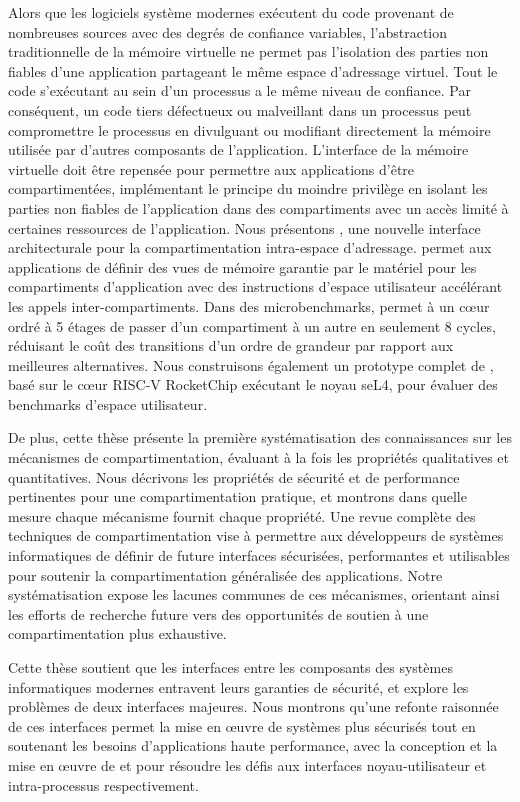 Alors que les logiciels système modernes exécutent du code provenant de nombreuses sources avec des degrés de confiance variables, l'abstraction traditionnelle de la mémoire virtuelle ne permet pas l'isolation des parties non fiables d'une application partageant le même espace d'adressage virtuel. 
Tout le code s'exécutant au sein d'un processus a le même niveau de confiance. 
Par conséquent, un code tiers défectueux ou malveillant dans un processus peut compromettre le processus en divulguant ou modifiant directement la mémoire utilisée par d'autres composants de l'application. 
L'interface de la mémoire virtuelle doit être repensée pour permettre aux applications d'être compartimentées, implémentant le principe du moindre privilège en isolant les parties non fiables de l'application dans des compartiments avec un accès limité à certaines ressources de l'application. 
Nous présentons \seccells, une nouvelle interface architecturale pour la compartimentation intra-espace d'adressage. \seccells permet aux applications de définir des vues de mémoire garantie par le matériel pour les compartiments d'application avec des instructions d'espace utilisateur accélérant les appels inter-compartiments. 
Dans des microbenchmarks, \seccells permet à un cœur ordré à 5 étages de passer d'un compartiment à un autre en seulement 8 cycles, réduisant le coût des transitions d'un ordre de grandeur par rapport aux meilleures alternatives. 
Nous construisons également un prototype complet de \seccells, basé sur le cœur RISC-V RocketChip exécutant le noyau seL4, pour évaluer des benchmarks d'espace utilisateur.

De plus, cette thèse présente la première systématisation des connaissances sur les mécanismes de compartimentation, évaluant à la fois les propriétés qualitatives et quantitatives. 
Nous décrivons les propriétés de sécurité et de performance pertinentes pour une compartimentation pratique, et montrons dans quelle mesure chaque mécanisme fournit chaque propriété. 
Une revue complète des techniques de compartimentation vise à permettre aux développeurs de systèmes informatiques de définir de future interfaces sécurisées, performantes et utilisables pour soutenir la compartimentation généralisée des applications.
Notre systématisation expose les lacunes communes de ces mécanismes, orientant ainsi les efforts de recherche future vers des opportunités de soutien à une compartimentation plus exhaustive.

Cette thèse soutient que les interfaces entre les composants des systèmes informatiques modernes entravent leurs garanties de sécurité, et explore les problèmes de deux interfaces majeures. 
Nous montrons qu'une refonte raisonnée de ces interfaces permet la mise en œuvre de systèmes plus sécurisés tout en soutenant les besoins d'applications haute performance, avec la conception et la mise en œuvre de \midas et \seccells pour résoudre les défis aux interfaces noyau-utilisateur et intra-processus respectivement.